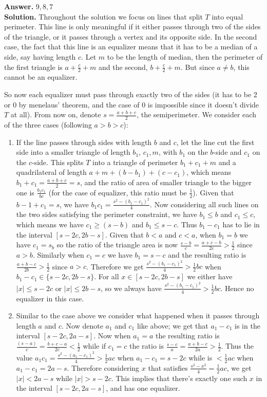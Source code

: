 \documentclass[11pt,a4paper]{article}
\newcommand{\<}{\langle}
\renewcommand{\>}{\rangle}
\begin{document}
\begin{enumerate}
	\textbf{Answer.} $9, 8, 7$ \\
	\textbf{Solution.} Throughout the solution we focus on lines that split $T$ into equal perimeter. This line is only meaningful if it either passes through two of the sides of the triangle, or it passes through a vertex and its opposite side. In the second case, the fact that this line is an equalizer means that it has to be a median of a side, say having length $c$. Let $m$ to be the length of median, then the perimeter of the first triangle is $a+\frac c2+m$ and the second, $b+\frac c2 + m$. But since $a\neq b$, this cannot be an equalizer. 
	
	So now each equalizer must pass through exactly two of the sides (it has to be 2 or 0 by menelaus' theorem, and the case of 0 is impossible since it doesn't divide $T$ at all). 
	From now on, denote $s=\frac{a+b+c}{2}$, the semiperimeter. 
	We consider each of the three cases (following $a>b>c$):
	\begin{enumerate}
		\item If the line passes through sides with length $b$ and $c$, let the line cut the first side into a smaller triangle of length $b_1$, $c_1, m$, with $b_1$ on the $b$-side and $c_1$ on the $c$-side. This splits $T$ into a triangle of perimeter $b_1+c_1+m$ and a quadrilateral of length $a+m+(b-b_1)+(c-c_1)$, which means $b_1+c_1=\frac{a+b+c}{2}=s$, and the ratio of area of smaller triangle to the bigger one is $\frac{b_1c_1}{bc}$ (for the case of equalizer, this ratio must be $\frac 12$). Given that $b-1+c_1=s$, we have $b_1c_1=\frac{s^2-(b_1-c_1)^2}{4}$. Now considering all such lines on the two sides satisfying the perimeter constraint, we have $b_1\le b$ and $c_1\le c$, which means we have $c_1\ge (s-b)$ and $b_1\le s-c$. Thus $b_1-c_1$ has to lie in the interval $[s-2c, 2b-s]$. Given that $b<a$ and $c<a$, when $b_1=b$ we have $c_1=s_b$ so the ratio of the triangle area is now $\frac{s-b}{c}=\frac{a+c-b}{2c}>\frac 12$ since $a>b$. Similarly when $c_1=c$ we have $b_1=s-c$ and the resulting ratio is $\frac{a+b-c}{2b}>\frac 12$ since $a>c$. Therefore we get $\frac{s^2-(b_1-c_1)^2}{4}>\frac 12 bc$ when $b_1-c_1\in\{s-2c, 2b-s\}$. For all $x\in [s-2c, 2b-s]$ we either have $|x|\le s-2c$ or $|x|\le 2b-s$, so we always have $\frac{s^2-(b_1-c_1)^2}{4}>\frac 12 bc$. Hence no equalizer in this case. 
		
		\item Similar to the case above we consider what happened when it passes through length $a$ and $c$. Now denote $a_1$ and $c_1$ like above; we get that $a_1-c_1$ is in the interval $[s-2c, 2a-s]$. Now when $a_1=a$ the resulting ratio is $\frac{(s-a)}{c}=\frac{b+c-a}{2c}<\frac 12$ while if $c_1=c$ the ratio is $\frac{s-c}{a}=\frac{a+b-c}{2a}>\frac 12$. Thus the value $a_1c_1=\frac{s^2-(a_1-c_1)^2}{4}>\frac 12 ac$ when $a_1-c_1=s-2c$ while is $<\frac 12 ac$ when $a_1-c_1=2a-s$. Therefore considering $x$ that satisfies $\frac{s^2-x^2}{4}=\frac 12 ac$, we get $|x|< 2a-s$ while $|x|>s-2c$. This implies that there's exactly one such $x$ in the interval $[s-2c, 2a-s]$, and has one equalizer. 
		

\end{enumerate}
\end{enumerate}
\end{document}
